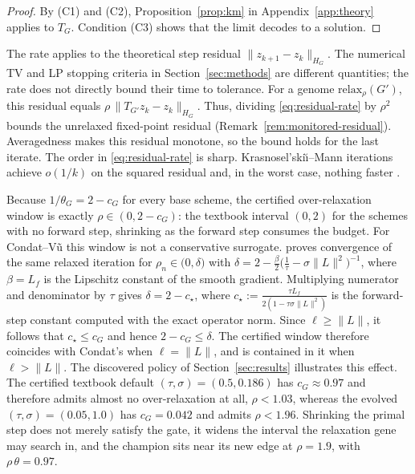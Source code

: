 \begin{proof}
By (C1) and (C2), Proposition~\ref{prop:km} in
Appendix~\ref{app:theory} applies to $T_G$. Condition (C3) shows that the
limit decodes to a solution.
\end{proof}

The rate applies to the theoretical step residual
$\|z_{k+1}-z_k\|_{H_G}$. The numerical TV and LP stopping criteria in
Section~\ref{sec:methods} are different quantities; the rate does not directly
bound their time to tolerance. For a genome
$\mathrm{relax}_\rho(G')$, this residual equals
$\rho\,\|T_{G'}z_k-z_k\|_{H_G}$. Thus, dividing
\eqref{eq:residual-rate} by $\rho^2$ bounds the unrelaxed fixed-point
residual (Remark~\ref{rem:monitored-residual}). Averagedness makes this
residual monotone, so the bound holds for the last iterate. The order in
\eqref{eq:residual-rate} is sharp.
Krasnosel'ski\u{\i}--Mann iterations achieve $o(1/k)$ on the squared residual
and, in the worst case, nothing faster
\citep{DavisYin2016Convergence,BravoCominetti2018Sharp}.

\begin{remark}
\label{rem:relaxation-window}
Because $1/\theta_G=2-c_G$ for every base scheme, the certified
over-relaxation window is exactly $\rho\in(0,2-c_G)$: the textbook interval
$(0,2)$ for the schemes with no forward step, shrinking as the forward step
consumes the budget. For Condat--V\~u this window is not a conservative
surrogate. \citet[Theorem~3.1]{Condat2013Primal} proves convergence of the
same relaxed iteration for
$\rho_n\in\bigl(0,\delta\bigr)$ with
$\delta=2-\frac{\beta}{2}\bigl(\frac1\tau-\sigma\|L\|^2\bigr)^{-1}$, where
$\beta=L_f$ is the Lipschitz constant of the smooth gradient. Multiplying
numerator and denominator by $\tau$ gives
$\delta=2-c_\star$, where
$c_\star:=\frac{\tau L_f}{2(1-\tau\sigma\|L\|^2)}$ is the forward-step
constant computed with the exact operator norm. Since $\ell\geq\|L\|$, it follows
that $c_\star\leq c_G$ and hence $2-c_G\leq\delta$. The certified window
therefore coincides with Condat's when $\ell=\|L\|$, and is contained in it
when $\ell>\|L\|$. The discovered policy of Section~\ref{sec:results}
illustrates this effect. The certified textbook default
$(\tau,\sigma)=(0.5,0.186)$ has $c_G\approx0.97$ and therefore admits almost
no over-relaxation at all, $\rho<1.03$, whereas the evolved
$(\tau,\sigma)=(0.05,1.0)$ has $c_G=0.042$ and admits $\rho<1.96$. Shrinking
the primal step does not merely satisfy the gate, it widens the interval the
relaxation gene may search in, and the champion sits near its new edge at
$\rho=1.9$, with $\rho\,\theta=0.97$.
\end{remark}

